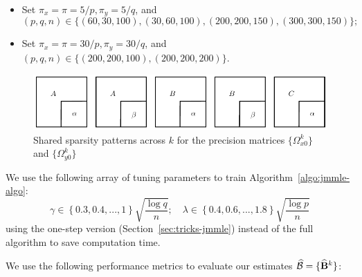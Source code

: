 \begin{itemize}
\item Set $\pi_x = \pi = 5/p, \pi_y = 5/q$, and
%
$$
(p,q,n) \in \{ (60,30,100), (30,60,100), (200,200,150), (300,300,150) \};
$$

\item Set $\pi_x = \pi = 30/p, \pi_y = 30/q$, and $(p,q,n) \in  \{ (200,200,100), (200,200,200) \}$.
\end{itemize}
%

\begin{figure}
\centering
\includegraphics{omega-structure}
\caption{Shared sparsity patterns across $k$ for the precision matrices $\{ \Omega_{x0}^k\}$ and $\{ \Omega_{y0}^k\}$}
\label{fig:sim-structure}
\end{figure}

We use the following array of tuning parameters to train Algorithm~\ref{algo:jmmle-algo}:
%
$$
\gamma \in \left\{ 0.3, 0.4, ..., 1 \right\} \sqrt{\frac{\log q}{n}}; \quad
\lambda \in \left\{ 0.4, 0.6, ..., 1.8 \right\} \sqrt{\frac{\log p}{n}}
$$
%
using the one-step version (Section~\ref{sec:tricks-jmmle}) instead of the full algorithm to save computation time.

We use the following performance metrics to evaluate our estimates $\widehat {{\cal{B}}} = \{ \widehat {{\mathbf{B}}}^k \}$:

